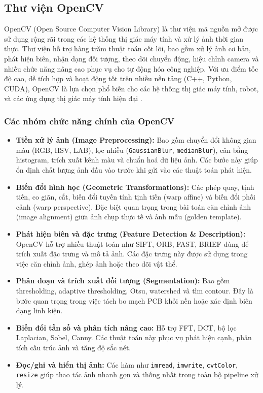 \subsection{Thư viện OpenCV}

OpenCV (Open Source Computer Vision Library) là thư viện mã nguồn mở được sử dụng rộng rãi trong các hệ thống thị giác máy tính và xử lý ảnh thời gian thực. Thư viện hỗ trợ hàng trăm thuật toán cốt lõi, bao gồm xử lý ảnh cơ bản, phát hiện biên, nhận dạng đối tượng, theo dõi chuyển động, hiệu chỉnh camera và nhiều chức năng nâng cao phục vụ cho tự động hóa công nghiệp. Với ưu điểm tốc độ cao, dễ tích hợp và hoạt động tốt trên nhiều nền tảng (C++, Python, CUDA), OpenCV là lựa chọn phổ biến cho các hệ thống thị giác máy tính, robot, và các ứng dụng thị giác máy tính hiện đại \cite{opencv_python_tutorial}.

\subsubsection*{Các nhóm chức năng chính của OpenCV}

\begin{itemize}
    \item \textbf{Tiền xử lý ảnh (Image Preprocessing):}  
    Bao gồm chuyển đổi không gian màu (RGB, HSV, LAB), lọc nhiễu (\texttt{GaussianBlur}, \texttt{medianBlur}), cân bằng histogram, trích xuất kênh màu và chuẩn hoá dữ liệu ảnh. Các bước này giúp ổn định chất lượng ảnh đầu vào trước khi gửi vào các thuật toán phát hiện.

    \item \textbf{Biến đổi hình học (Geometric Transformations):}  
    Các phép quay, tịnh tiến, co giãn, cắt, biến đổi tuyến tính \+ tịnh tiến (warp affine) và biến đổi phối cảnh (warp perspective). Đặc biệt quan trọng trong bài toán căn chỉnh ảnh (image alignment) giữa ảnh chụp thực tế và ảnh mẫu (golden template).

    \item \textbf{Phát hiện biên và đặc trưng (Feature Detection \& Description):}  
    OpenCV hỗ trợ nhiều thuật toán như SIFT, ORB, FAST, BRIEF dùng để trích xuất đặc trưng và mô tả ảnh. Các đặc trưng này được sử dụng trong việc căn chỉnh ảnh, ghép ảnh hoặc theo dõi vật thể.

    \item \textbf{Phân đoạn và trích xuất đối tượng (Segmentation):}  
    Bao gồm thresholding, adaptive thresholding, Otsu, watershed và tìm contour. Đây là bước quan trọng trong việc tách bo mạch PCB khỏi nền hoặc xác định biên dạng linh kiện.

    \item \textbf{Biến đổi tần số và phân tích nâng cao:}  
    Hỗ trợ FFT, DCT, bộ lọc Laplacian, Sobel, Canny. Các thuật toán này phục vụ phát hiện cạnh, phân tích cấu trúc ảnh và tăng độ sắc nét.

    \item \textbf{Đọc/ghi và hiển thị ảnh:}  
    Các hàm như \texttt{imread}, \texttt{imwrite}, \texttt{cvtColor}, \texttt{resize} giúp thao tác ảnh nhanh gọn và thống nhất trong toàn bộ pipeline xử lý.
\end{itemize}

